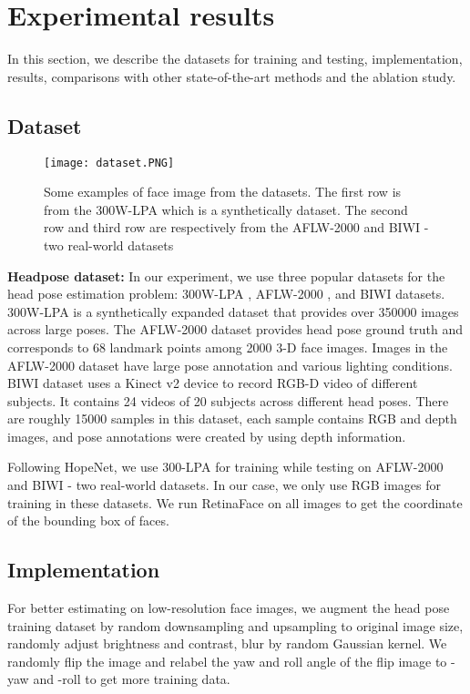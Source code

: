 \documentclass[a4paper,twoside]{article}
\begin{document}
\section{Experimental results}
In this section, we describe the datasets for training and testing, implementation, results, comparisons with other state-of-the-art methods and the ablation study.
\subsection{Dataset}
\begin{figure}[htp]
    \centering
    \texttt{[image: dataset.PNG]}
    \caption{Some examples of face image from the datasets. The first row is from the 300W-LPA \cite{hsu2019edge} which is a synthetically dataset. The second row and third row are respectively from the AFLW-2000 \cite{zhu2016face} and BIWI \cite{fanelli2011real} - two real-world datasets}
    \label{fig:galaxy}
\end{figure}

\textbf{Headpose dataset:} In our experiment, we use three popular datasets for the head pose estimation problem: 300W-LPA \cite{hsu2019edge}, AFLW-2000 \cite{zhu2012face}, and BIWI \cite{fanelli2011real} datasets. 300W-LPA is a synthetically expanded dataset that provides over 350000 images across large poses. The AFLW-2000 dataset provides head pose ground truth and corresponds to 68 landmark points among 2000 3-D face images. Images in the AFLW-2000 dataset have large pose annotation and various lighting conditions. BIWI dataset uses a Kinect v2 device to record RGB-D video of different subjects. It contains 24 videos of 20 subjects across different head poses. There are roughly 15000 samples in this dataset, each sample contains RGB and depth images, and pose annotations were created by using depth information.

Following HopeNet, we use 300-LPA for training while testing on AFLW-2000 and BIWI - two real-world datasets. In our case, we only use RGB images for training in these datasets. We run RetinaFace \cite{deng2019retinaface} on all images to get the coordinate of the bounding box of faces.

\subsection{Implementation}
For better estimating on low-resolution face images, we augment the head pose training dataset by random downsampling and upsampling to original image size, randomly adjust brightness and contrast, blur by random Gaussian kernel.
We randomly flip the image and relabel the yaw and roll angle of the flip image to -yaw and -roll to get more training data. 
\end{document}
